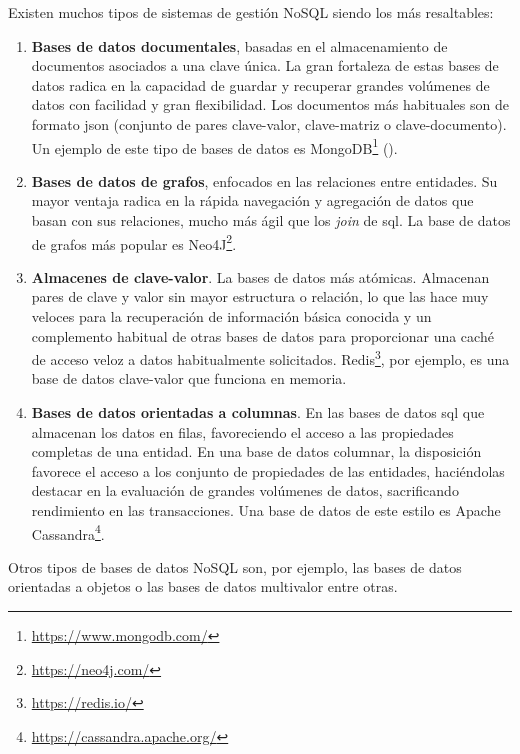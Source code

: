 Existen muchos tipos de sistemas de gestión NoSQL siendo los más resaltables:
\begin{enumerate}
	\item \textbf{Bases de datos documentales}, basadas en el almacenamiento de documentos asociados a una clave única. La gran fortaleza de estas bases de datos radica en la capacidad de guardar y recuperar grandes volúmenes de datos con facilidad y gran flexibilidad. Los documentos más habituales son de formato \acrshort{json} (conjunto de pares clave-valor, clave-matriz o clave-documento). Un ejemplo de este tipo de bases de datos es MongoDB\footnote{\href{https://www.mongodb.com/}{https://www.mongodb.com/}} ().
	\item \textbf{Bases de datos de grafos}, enfocados en las relaciones entre entidades. Su mayor ventaja radica en la rápida navegación y agregación de datos que basan con sus relaciones, mucho más ágil que los \emph{\gls{join}} de \acrshort{sql}. La base de datos de grafos más popular es Neo4J\footnote{\href{https://neo4j.com/}{https://neo4j.com/}}.
	\item \textbf{Almacenes de clave-valor}. La bases de datos más atómicas. Almacenan pares de clave y valor sin mayor estructura o relación, lo que las hace muy veloces para la recuperación de información básica conocida y un complemento habitual de otras bases de datos para proporcionar una caché de acceso veloz a datos habitualmente solicitados. Redis\footnote{\href{https://redis.io/}{https://redis.io/}}, por ejemplo, es una base de datos clave-valor que funciona en memoria.
	\item \textbf{Bases de datos orientadas a columnas}. En las bases de datos \acrshort{sql} que almacenan los datos en filas, favoreciendo el acceso a las propiedades completas de una entidad. En una base de datos columnar, la disposición favorece el acceso a los conjunto de propiedades de las entidades, haciéndolas destacar en la evaluación de grandes volúmenes de datos, sacrificando rendimiento en las transacciones. Una base de datos de este estilo es Apache Cassandra\footnote{\href{https://cassandra.apache.org/}{https://cassandra.apache.org/}}. 
\end{enumerate}

Otros tipos de bases de datos NoSQL son, por ejemplo, las bases de datos orientadas a objetos o las bases de datos multivalor entre otras.